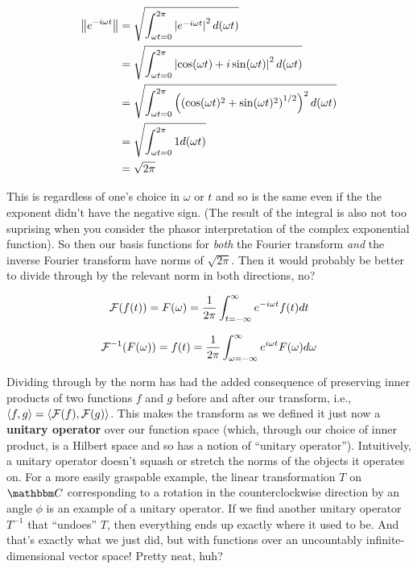 \documentclass[letterpaper,12pt]{report}
\begin{document}
\[\begin{split}
  \norm[e^{-i\omega t}] &= \sqrt{\int_{\omega t=0}^{2\pi} \abs{e^{-i\omega t}}^2 d(\omega t)} \\
  &= \sqrt{\int_{\omega t=0}^{2\pi} \abs{\cos(\omega t) + i\sin(\omega t)}^2 d(\omega t)} \\
  &= \sqrt{\int_{\omega t=0}^{2\pi}
  \left(
    \left(\cos(\omega t)^2 + \sin(\omega t)^2\right)^{1/2}
    \right)^2 
    d(\omega t)} \\
  &= \sqrt{\int_{\omega t=0}^{2\pi} 1 d(\omega t)} \\
  &= \sqrt{2\pi}
\end{split}\]

This is regardless of one's choice in \(\omega\) or \(t\) and
so is the same even if the the exponent didn't have the
negative sign.
(The result of the integral is
also not too suprising when you consider the phasor interpretation of the complex exponential function).
So then our basis functions for \emph{both} the Fourier
transform \emph{and} the inverse Fourier transform have
norms of \(\sqrt{2\pi}\). Then it would probably be better
to divide through by the relevant norm in both directions, no?

\[\mathcal{F}(f(t)) = F(\omega)
  = \frac{1}{2\pi} \int_{t=-\infty}^{\infty} e^{-i\omega t} f(t) dt\]

\[\mathcal{F}^{-1}(F(\omega)) = f(t)
  = \frac{1}{2\pi} \int_{\omega=-\infty}^{\infty} e^{i\omega t} F(\omega) d\omega\]

Dividing through by the norm has had the added consequence
of preserving inner products of two functions \(f\) and \(g\)
before and after our transform, i.e., 
\(\innerprod[f][g] = \innerprod[\fancy{F}(f)][\fancy{F}(g)]\).
This makes the transform as we defined it just now a
\textbf{unitary operator} over
our function space (which, through our choice of inner product,
is a Hilbert space and so has a notion of ``unitary operator'').
Intuitively, a unitary operator doesn't squash or stretch
the norms of the objects it operates on. For a more easily
graspable example, the linear transformation \(T\)
on \(\domain{C}\)
corresponding to a rotation in the counterclockwise direction
by an angle \(\phi\) is an example of a unitary operator.
If we find another unitary operator \(T^{-1}\) 
that ``undoes'' \(T\), then everything ends up exactly where
it used to be. And that's exactly what we just did,
but with functions 
over an uncountably infinite-dimensional vector space!
Pretty neat, huh?
\end{document}

